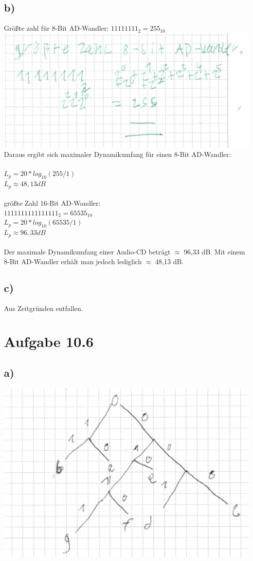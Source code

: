 \documentclass{article}
\begin{document}
	\subsection*{b)}
	Größte zahl für 8-Bit AD-Wandler: $11111111_2 = 255_{10}$ \\
	\includegraphics[width=\linewidth]{"105b"} \\
	Daraus ergibt sich maximaler Dynamikumfang für einen 8-Bit AD-Wandler: \\ \\
	$L_p = 20 * log_{10}(255/1)$ \\
	$L_p \approx 48,13 dB$ \\ \\
	größte Zahl 16-Bit AD-Wandler: \\
	$1111111111111111_2 = 65535_{10}$ \\
	$L_p = 20 * log_{10}(65535/1)$ \\
	$L_p \approx 96,33 dB$ \\ \\
	Der maximale Dynamikumfang einer Audio-CD beträgt $\approx$ 96,33 dB. Mit einem 8-Bit AD-Wandler erhält man jedoch lediglich  $\approx$ 48,13 dB.
	\subsection*{c)}
	Aus Zeitgründen entfallen.
	\section*{Aufgabe 10.6}
	\subsection*{a)}
	\includegraphics[width=\linewidth]{106a}
\end{document}
